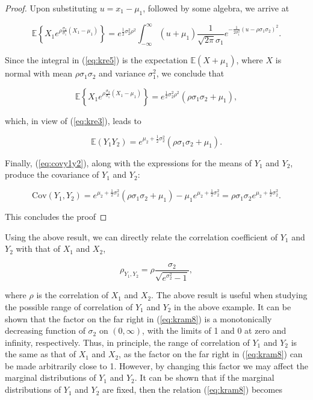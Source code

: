 \documentclass[
]{jss}
\begin{document}
\begin{proof}
Upon substituting $u=x_1-\mu_1$, followed by some algebra, we arrive at 

\begin{equation}
\label{eq:kre5}
\mathbb E \left\{ X_1 e^{ \rho\frac{\sigma_2}{\sigma_1} (X_1-\mu_1)} \right\} = e^{\frac{1}{2}\sigma_2^2\rho^2} \int_{-\infty}^\infty (u+\mu_1)  \frac{1}{\sqrt{2\pi}\sigma_1} e^{-\frac{1}{2\sigma_1^2}(u-\rho\sigma_1\sigma_2)^2}.
\end{equation}

Since the integral in (\ref{eq:kre5}) is the expectation $\mathbb E(X+\mu_1)$, where $X$ is normal with mean $\rho\sigma_1\sigma_2$ and variance $\sigma_1^2$, we conclude that 

\begin{equation}
\label{eq:kre6}
\mathbb E \left\{ X_1 e^{ \rho\frac{\sigma_2}{\sigma_1} (X_1-\mu_1)} \right\} = e^{\frac{1}{2}\sigma_2^2\rho^2} (\rho\sigma_1\sigma_2 +\mu_1),
\end{equation}

which, in view of (\ref{eq:kre3}), leads to 

\begin{equation}
\label{eq:kre7}
\mathbb E (Y_1Y_2) = e^{\mu_2 + \frac{1}{2}\sigma_2^2} (\rho\sigma_1\sigma_2 +\mu_1).
\end{equation}

Finally, (\ref{eq:covy1y2}), along with the expressions for the means of $Y_1$ and $Y_2$, produce the covariance of $Y_1$ and $Y_2$:

\begin{equation}
\label{eq:kre8}
\mbox{Cov}(Y_1, Y_2) = e^{\mu_2 + \frac{1}{2}\sigma_2^2} (\rho\sigma_1\sigma_2 +\mu_1) - \mu_1 e^{\mu_2 + \frac{1}{2}\sigma_2^2} = \rho\sigma_1\sigma_2 e^{\mu_2 + \frac{1}{2}\sigma_2^2}.
\end{equation}

This concludes the proof
\end{proof}

Using the above result, we can directly relate the correlation coefficient of \(Y_1\) and \(Y_2\) with that of \(X_1\) and \(X_2\),

\begin{equation}
\label{eq:kram8}
\rho_{Y_1, Y_2} = \rho \frac{\sigma_2}{\sqrt{e^{\sigma_2^2} -1}},
\end{equation}

where \(\rho\) is the correlation of \(X_1\) and \(X_2\). The above result is useful when studying the possible range of correlation of \(Y_1\) and \(Y_2\) in the above example. It can be shown that the factor on the far right in (\ref{eq:kram8}) is a monotonically decreasing function of \(\sigma_2\) on \((0,\infty)\), with the limits of 1 and 0 at zero and infinity, respectively. Thus, in principle, the range of correlation of \(Y_1\) and \(Y_2\) is the same as that of \(X_1\) and \(X_2\), as the factor on the far right in (\ref{eq:kram8}) can be made arbitrarily close to 1. However, by changing this factor we may affect the marginal distributions of \(Y_1\) and \(Y_2\). It can be shown that if the marginal distributions of \(Y_1\) and \(Y_2\) are fixed, then the relation (\ref{eq:kram8}) becomes
\end{document}
